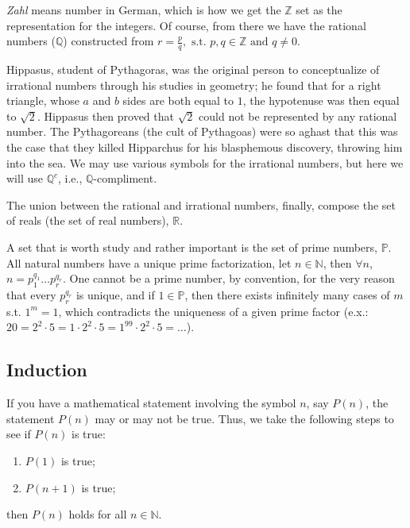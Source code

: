 \documentclass[12pt,oneside]{report}
\begin{document}
\textit{Zahl} means number in German, which is how we get the \( \mathbb{Z} \) set as the representation for the integers. Of course, from there we have the rational numbers (\( \mathbb{Q} \)) constructed from \( r=\frac{p}{q}, \text{ s.t. } p,q\in \mathbb{Z} \text{ and } q\neq 0\). 

Hippasus, student of Pythagoras, was the original person to conceptualize of irrational numbers through his studies in geometry; he found that for a right triangle, whose \( a \) and \( b \) sides are both equal to \( 1 \), the hypotenuse was then equal to \( \sqrt{2}  \). Hippasus then proved that \( \sqrt{2}  \) could not be represented by any rational number. The Pythagoreans (the cult of Pythagoas) were so aghast that this was the case that they killed Hipparchus for his blasphemous discovery, throwing him into the sea. We may use various symbols for the irrational numbers, but here we will use \( \mathbb{Q}^c \), i.e., \( \mathbb{Q} \)-compliment.

The union between the rational and irrational numbers, finally, compose the set of reals (the set of real numbers), \( \mathbb{R} \). 

A set that is worth study and rather important is the set of prime numbers, \( \mathbb{P} \). All natural numbers have a unique prime factorization, let \( n\in \mathbb{N} \), then \( \forall n \), \( n=p_{1}^{q_{1}}\ldots p_{r}^{q_{r}} \). One cannot be a prime number, by convention, for the very reason that every \( p_{r}^{q_{r}} \) is unique, and if \( 1 \in \mathbb{P} \), then there exists infinitely many cases of $m$ s.t. \( 1^m=1 \), which contradicts the uniqueness of a given prime factor (e.x.: \( 20=2^2\cdot 5=1\cdot 2^2\cdot 5=1^{99}\cdot 2^2\cdot 5=\ldots  \)). 

\subsection{Induction}

If you have a mathematical statement involving the symbol \( n \), say \( P(n) \), the statement \( P(n) \) may or may not be true. Thus, we take the following steps to see if \( P(n) \) is true:
\begin{enumerate}
  \item \( P(1) \) is true;
    
    \item \( P(n+1) \) is true;
\end{enumerate}

then \(  P(n) \) holds for all \( n\in \mathbb{N} \). 
\end{document}

